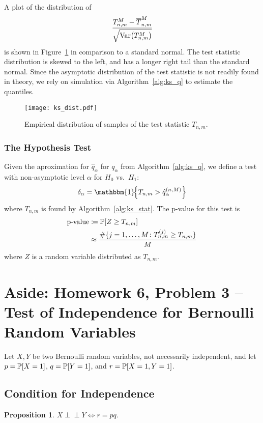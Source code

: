 \documentclass[letterpaper, reqno]{amsart}
\newtheorem{prop}{Proposition}[section]
\numberwithin{equation}{section}
\newcommand{\Prob}[1]{\mathbb{P}\mleft[#1\mright]}
\newcommand{\Var}[1]{\operatorname{Var}\mleft(#1\mright)}
\newcommand{\indep}{\perp \!\!\! \perp}  %
\newcommand{\indic}[1]{\mathbbm{1}\!\mleft\{#1\mright\}} %
\begin{document}
A plot of the distribution of
\[ \frac{T_{n,m}^M - \overline{T}_{n,m}^M}{\sqrt{\Var{T_{n,m}^M}}} \]
is shown in Figure~\ref{fig:Tnm} in comparison to a standard normal. The test
statistic distribution is skewed to the left, and has a longer right tail than
the standard normal.
Since the asymptotic distribution of the test statistic is not readily found in
theory, we rely on simulation via Algorithm~\ref{alg:ks_q} to estimate the
quantiles.

\begin{figure}[!h]
  \centering
  \texttt{[image: ks\_dist.pdf]}
  \caption{Empirical distribution of samples of the test statistic $T_{n,m}$.}
  \label{fig:Tnm}
\end{figure}

\subsubsection{The Hypothesis Test}
Given the aproximation for $\hat{q}_\alpha$ for $q_\alpha$ from
Algorithm~\ref{alg:ks_q}, we define a test with non-asymptotic level $\alpha$
for $H_0$ vs.\ $H_1$:
\begin{equation}
  \delta_\alpha = \indic{T_{n,m} > \hat{q}_\alpha^{(n, M)}}
\end{equation}
where $T_{n,m}$ is found by Algorithm~\ref{alg:ks_stat}. The p-value for this
test is
\begin{align}
  \text{p-value} &\coloneqq \Prob{Z \ge T_{n,m}} \\
  &\approx \frac{\#\{j = 1, \dots, M \colon T_{n,m}^{(j)} \ge T_{n,m}\}}{M}
\end{align}
where $Z$ is a random variable distributed as $T_{n,m}$.

\clearpage
\section{Aside: Homework 6, Problem 3 -- Test of Independence for Bernoulli Random Variables}
Let $X, Y$ be two Bernoulli random variables, not necessarily independent, and
let $p = \Prob{X=1}$, $q = \Prob{Y=1}$, and $r = \Prob{X=1, Y=1}$.

\subsection{Condition for Independence}
\begin{prop}
  $X \indep Y \iff r = pq$.
\end{prop}
\end{document}
